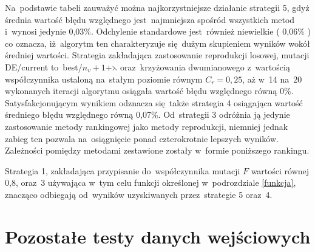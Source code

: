 Na~podstawie tabeli zauważyć można najkorzystniejsze działanie strategii 5, gdyż średnia wartość błędu względnego jest~najmniejsza spośród wszystkich metod i~wynosi jedynie 0,03\%. Odchylenie standardowe jest~również niewielkie ( 0,06\% ) co oznacza, iż~algorytm ten charakteryzuje się~dużym skupieniem wyników wokół średniej wartości. Strategia zakładająca zastosowanie reprodukcji losowej, mutacji DE/current to~best/$n_{v}+1$+$\leftthreetimes$ oraz~krzyżowania dwumianowego z~wartością współczynnika ustaloną na~stałym poziomie równym $C_{r} = 0,25$, aż w~14 na~20 wykonanych iteracji algorytmu osiągała wartość błędu względnego równą 0\%. Satysfakcjonującym wynikiem odznacza się~także strategia 4 osiągająca wartość średniego błędu względnego równą 0,07\%. Od~strategii 3 odróżnia ją jedynie zastosowanie metody rankingowej jako metody reprodukcji, niemniej jednak zabieg ten pozwala na~osiągnięcie ponad czterokrotnie lepszych wyników. Zależności pomiędzy metodami zestawione zostały w~formie poniższego rankingu. 


\begin{table}[h]
\begin{center}
\caption{Ranking zastosowanych strategii dla danych wejściowych II.}
\label{rankingduzedane}
\end{center}
\end{table}

Strategia 1, zakładająca przypisanie do~współczynnika mutacji $F$ wartości równej 0,8, oraz~3 używająca w~tym celu funkcji określonej w~podrozdziale \ref{funkcja}, znacząco odbiegają od~wyników uzyskiwanych przez~strategie 5 oraz~4. 

\section{Pozostałe testy danych wejściowych}

